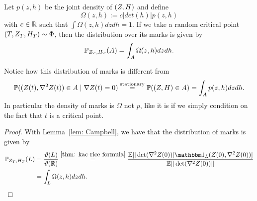 \begin{corollary}
	\label{cor: mark distribution}
	Let \(p(z,h)\) be the joint density of \((Z, H)\) and define
	\[
		\Omega(z,h) := c |det(h)| p(z,h)
	\]
	with \(c\in\mathbb{R}\) such that \(\int \Omega(z,h)dz dh = 1\).
	If we take a random critical point \((T,Z_T,H_T)\sim \Phi\),
	then the distribution over its marks is given by
	\[
		\mathbb{P}_{Z_T,H_T}(A) = \int_A \Omega(z,h) dz dh.
	\]
\end{corollary}
\begin{remark}
	Notice how this distribution of marks is different from
	\[
		\mathbb{P}((Z(t),\nabla^2Z(t))\in A \mid \nabla Z(t) = 0)
		\overset{\text{stationary}}
		= \mathbb{P}((Z,H)\in A)
		= \int_A p(z,h)dz dh.
	\]
	In particular the density of marks is \(\Omega\) not \(p\), like it is if
	we simply condition on the fact that \(t\) is a critical point.
\end{remark}
\begin{proof}
	With Lemma~\ref{lem: Campbell}, we have that the distribution of marks is
	given by
	\begin{align*}
		\Pr_{\rf_T,H_T}(L)
		&= \frac{\intensity(L)}{\intensity(\real)}
		\overset{\ref{thm: kac-rice formula}}= \frac{
			\E[|\det(\nabla^2 \rf(0))|
			\ind_L(\rf(0), \nabla^2\rf(0))
			]
		}{
			\E[|\det(\nabla^2 \rf(0))|]
		}\\
		&= \int_L \Omega(z,h) dz dh.
		\qedhere
	\end{align*}
\end{proof}
